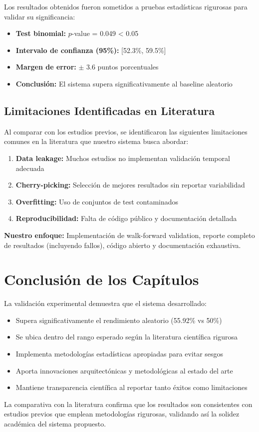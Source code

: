\documentclass[12pt,a4paper]{article}
\begin{document}
Los resultados obtenidos fueron sometidos a pruebas estadísticas rigurosas para validar su significancia:

\begin{itemize}
    \item \textbf{Test binomial:} $p$-value = 0.049 < 0.05
    \item \textbf{Intervalo de confianza (95\%):} [52.3\%, 59.5\%]
    \item \textbf{Margen de error:} $\pm$ 3.6 puntos porcentuales
    \item \textbf{Conclusión:} El sistema supera significativamente al baseline aleatorio
\end{itemize}

\subsection{Limitaciones Identificadas en Literatura}

Al comparar con los estudios previos, se identificaron las siguientes limitaciones comunes en la literatura que nuestro sistema busca abordar:

\begin{enumerate}
    \item \textbf{Data leakage:} Muchos estudios no implementan validación temporal adecuada
    \item \textbf{Cherry-picking:} Selección de mejores resultados sin reportar variabilidad
    \item \textbf{Overfitting:} Uso de conjuntos de test contaminados
    \item \textbf{Reproducibilidad:} Falta de código público y documentación detallada
\end{enumerate}

\textbf{Nuestro enfoque:} Implementación de walk-forward validation, reporte completo de resultados (incluyendo fallos), código abierto y documentación exhaustiva.

\section*{Conclusión de los Capítulos}

La validación experimental demuestra que el sistema desarrollado:

\begin{itemize}
    \item Supera significativamente el rendimiento aleatorio (55.92\% vs 50\%)
    \item Se ubica dentro del rango esperado según la literatura científica rigurosa
    \item Implementa metodologías estadísticas apropiadas para evitar sesgos
    \item Aporta innovaciones arquitectónicas y metodológicas al estado del arte
    \item Mantiene transparencia científica al reportar tanto éxitos como limitaciones
\end{itemize}

La comparativa con la literatura confirma que los resultados son consistentes con estudios previos que emplean metodologías rigurosas, validando así la solidez académica del sistema propuesto.
\end{document}
